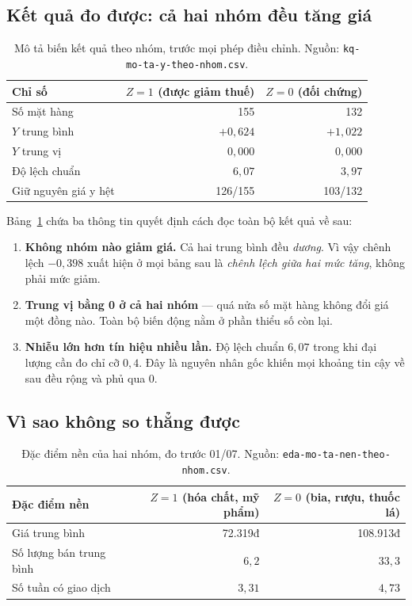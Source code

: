 \documentclass[11pt]{article}
\begin{document}
\subsection{Kết quả đo được: cả hai nhóm đều tăng giá}
\label{sec:mo-ta-y}

\begin{table}[htbp]
  \centering
  \caption{Mô tả biến kết quả theo nhóm, trước mọi phép điều chỉnh. Nguồn:
  \texttt{kq-mo-ta-y-theo-nhom.csv}.}
  \label{tab:mo-ta-y}
  \begin{tabular}{lrr}
    \toprule
    Chỉ số & $Z=1$ (được giảm thuế) & $Z=0$ (đối chứng) \\
    \midrule
    Số mặt hàng          & 155         & 132 \\
    $Y$ trung bình       & $+0{,}624$  & $+1{,}022$ \\
    $Y$ trung vị         & $0{,}000$   & $0{,}000$ \\
    Độ lệch chuẩn        & $6{,}07$    & $3{,}97$ \\
    Giữ nguyên giá y hệt & 126/155     & 103/132 \\
    \bottomrule
  \end{tabular}
\end{table}

Bảng~\ref{tab:mo-ta-y} chứa ba thông tin quyết định cách đọc toàn bộ kết quả về sau:

\begin{enumerate}
  \item \textbf{Không nhóm nào giảm giá.} Cả hai trung bình đều \emph{dương}. Vì vậy chênh lệch
  $-0{,}398$ xuất hiện ở mọi bảng sau là \emph{chênh lệch giữa hai mức tăng}, không phải mức giảm.
  \item \textbf{Trung vị bằng 0 ở cả hai nhóm} --- quá nửa số mặt hàng không đổi giá một đồng nào.
  Toàn bộ biến động nằm ở phần thiểu số còn lại.
  \item \textbf{Nhiễu lớn hơn tín hiệu nhiều lần.} Độ lệch chuẩn $6{,}07$ trong khi đại lượng cần
  đo chỉ cỡ $0{,}4$. Đây là nguyên nhân gốc khiến mọi khoảng tin cậy về sau đều rộng và phủ qua 0.
\end{enumerate}

\subsection{Vì sao không so thẳng được}

\begin{table}[htbp]
  \centering
  \caption{Đặc điểm nền của hai nhóm, đo trước 01/07. Nguồn:
  \texttt{eda-mo-ta-nen-theo-nhom.csv}.}
  \label{tab:bien-nen}
  \begin{tabular}{lrr}
    \toprule
    Đặc điểm nền & $Z=1$ (hóa chất, mỹ phẩm) & $Z=0$ (bia, rượu, thuốc lá) \\
    \midrule
    Giá trung bình            & 72.319đ & 108.913đ \\
    Số lượng bán trung bình   & $6{,}2$ & $33{,}3$ \\
    Số tuần có giao dịch      & $3{,}31$ & $4{,}73$ \\
    \bottomrule
  \end{tabular}
\end{table}
\end{document}
